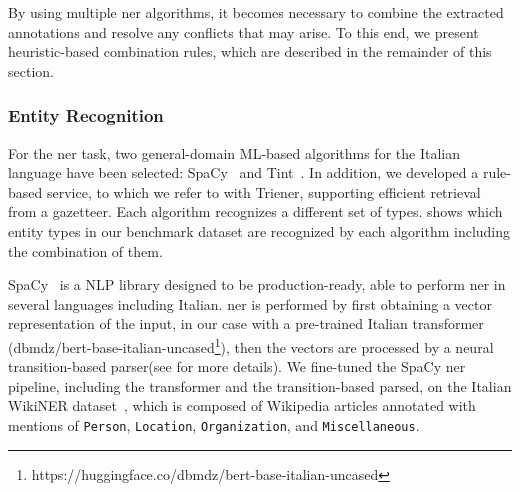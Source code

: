 
By using multiple \ac{ner} algorithms, it becomes necessary to combine the extracted annotations and resolve any conflicts that may arise. To this end, we present heuristic-based combination rules, which are described in the remainder of this section. 



\subsubsection{Entity Recognition}          




For the \ac{ner} task, two general-domain ML-based algorithms for the Italian language have been selected: SpaCy~\cite{honnibal2020spacy} and Tint~\cite{2018tint2}.
In addition, we developed a rule-based service, to which we refer to with Trie\ac{ner}, supporting efficient retrieval from a gazetteer. Each algorithm recognizes a different set of types.  shows which entity types in our benchmark dataset are recognized by each algorithm including the combination of them.  

SpaCy~\cite{honnibal2020spacy} is a NLP library designed to be production-ready, able to perform \ac{ner} in several languages including Italian. \ac{ner} is performed by first obtaining a vector representation of the input, in our case with a pre-trained Italian transformer (dbmdz/bert-base-italian-uncased\footnote{https://huggingface.co/dbmdz/bert-base-italian-uncased}), then the vectors are processed by a neural transition-based parser(see  for more details). We fine-tuned the SpaCy \ac{ner} pipeline, including the transformer and the transition-based parsed, on the Italian WikiNER dataset~\cite{NOTHMAN2013151}, which is composed of Wikipedia articles annotated with mentions of \texttt{Person}, \texttt{Location}, \texttt{Organization}, and \texttt{Miscellaneous}.

